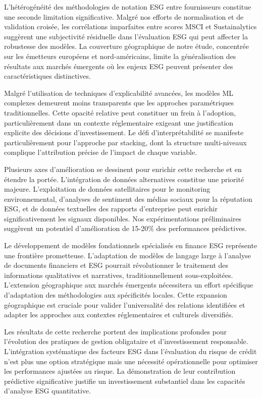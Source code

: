 L'hétérogénéité des méthodologies de notation ESG entre fournisseurs constitue une seconde limitation significative. Malgré nos efforts de normalisation et de validation croisée, les corrélations imparfaites entre scores MSCI et Sustainalytics suggèrent une subjectivité résiduelle dans l'évaluation ESG qui peut affecter la robustesse des modèles. La couverture géographique de notre étude, concentrée sur les émetteurs européens et nord-américains, limite la généralisation des résultats aux marchés émergents où les enjeux ESG peuvent présenter des caractéristiques distinctives.

Malgré l'utilisation de techniques d'explicabilité avancées, les modèles ML complexes demeurent moins transparents que les approches paramétriques traditionnelles. Cette opacité relative peut constituer un frein à l'adoption, particulièrement dans un contexte réglementaire exigeant une justification explicite des décisions d'investissement. Le défi d'interprétabilité se manifeste particulièrement pour l'approche par stacking, dont la structure multi-niveaux complique l'attribution précise de l'impact de chaque variable.

Plusieurs axes d'amélioration se dessinent pour enrichir cette recherche et en étendre la portée. L'intégration de données alternatives constitue une priorité majeure. L'exploitation de données satellitaires pour le monitoring environnemental, d'analyses de sentiment des médias sociaux pour la réputation ESG, et de données textuelles des rapports d'entreprise peut enrichir significativement les signaux disponibles. Nos expérimentations préliminaires suggèrent un potentiel d'amélioration de 15-20\% des performances prédictives.

Le développement de modèles fondationnels spécialisés en finance ESG représente une frontière prometteuse. L'adaptation de modèles de langage large à l'analyse de documents financiers et ESG pourrait révolutionner le traitement des informations qualitatives et narratives, traditionnellement sous-exploitées. L'extension géographique aux marchés émergents nécessitera un effort spécifique d'adaptation des méthodologies aux spécificités locales. Cette expansion géographique est cruciale pour valider l'universalité des relations identifiées et adapter les approches aux contextes réglementaires et culturels diversifiés.

Les résultats de cette recherche portent des implications profondes pour l'évolution des pratiques de gestion obligataire et d'investissement responsable. L'intégration systématique des facteurs ESG dans l'évaluation du risque de crédit n'est plus une option stratégique mais une nécessité opérationnelle pour optimiser les performances ajustées au risque. La démonstration de leur contribution prédictive significative justifie un investissement substantiel dans les capacités d'analyse ESG quantitative.

